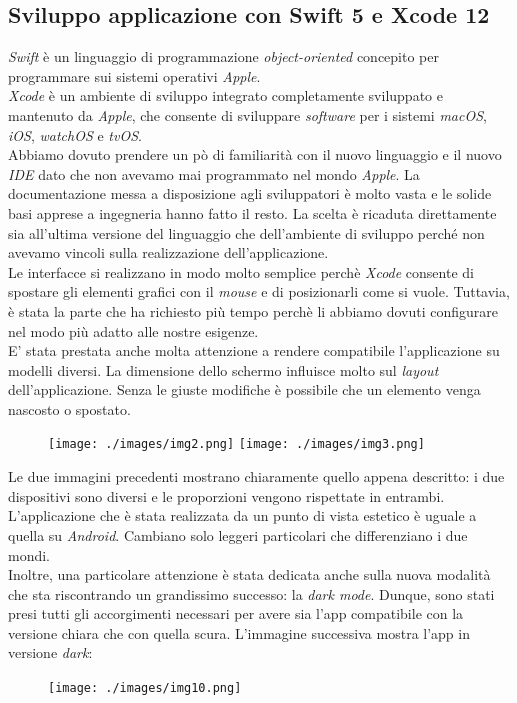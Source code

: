 \subsection{Sviluppo applicazione con Swift 5 e Xcode 12}
\textit{Swift} è un linguaggio di programmazione \textit{object-oriented} concepito per programmare sui sistemi operativi \textit{Apple}.\\
\newline
\textit{Xcode} è un ambiente di sviluppo integrato completamente sviluppato e mantenuto da \textit{Apple}, che consente di sviluppare \textit{software} per i sistemi \textit{macOS}, \textit{iOS}, \textit{watchOS} e \textit{tvOS}.\\
\newline
Abbiamo dovuto prendere un pò di familiarità con il nuovo linguaggio e il nuovo \textit{IDE} dato che non avevamo mai programmato nel mondo \textit{Apple}. La documentazione messa a disposizione agli sviluppatori è molto vasta e le solide basi apprese a ingegneria hanno fatto il resto.
La scelta è ricaduta direttamente sia all'ultima versione del linguaggio che dell'ambiente di sviluppo perché non avevamo vincoli sulla realizzazione dell'applicazione.\\
\newline
Le interfacce si realizzano in modo molto semplice perchè \textit{Xcode} consente di spostare gli elementi grafici con il \textit{mouse} e di posizionarli come si vuole. Tuttavia, è stata la parte che ha richiesto più tempo perchè li abbiamo dovuti configurare nel modo più adatto alle nostre esigenze.\\
\newline
E' stata prestata anche molta attenzione a rendere compatibile l'applicazione su modelli diversi. La dimensione dello schermo influisce molto sul \textit{layout} dell'applicazione. Senza le giuste modifiche è possibile che un elemento venga nascosto o spostato.
\begin{figure}[H]
	\centering
	\texttt{[image: ./images/img2.png]}
	\texttt{[image: ./images/img3.png]}
\end{figure}
\noindent Le due immagini precedenti mostrano chiaramente quello appena descritto: i due dispositivi sono diversi e le proporzioni vengono rispettate in entrambi.\\
\newline
L'applicazione che è stata realizzata da un punto di vista estetico è uguale a quella su \textit{Android}. Cambiano solo leggeri particolari che differenziano i due mondi.\\
\newline
Inoltre, una particolare attenzione è stata dedicata anche sulla nuova modalità che sta riscontrando un grandissimo successo: la \textit{dark mode}. Dunque, sono stati presi tutti gli accorgimenti necessari per avere sia l'app compatibile con la versione chiara che con quella scura. L'immagine successiva mostra l'app in versione \textit{dark}:
\begin{figure}[H]
	\centering
	\texttt{[image: ./images/img10.png]}
\end{figure}

